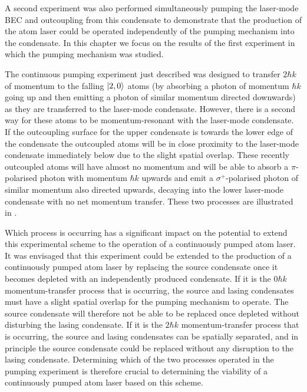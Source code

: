 A second experiment was also performed simultaneously pumping the laser-mode BEC and outcoupling from this condensate to demonstrate that the production of the atom laser could be operated independently of the pumping mechanism into the condensate.  In this chapter we focus on the results of the first experiment in which the pumping mechanism was studied.

\parasep

The continuous pumping experiment just described was designed to transfer $2 \hbar k$ of momentum to the falling ${\left|2, 0\right>}$ atoms (by absorbing a photon of momentum $\hbar k$ going up and then emitting a photon of similar momentum directed downwards) as they are transferred to the laser-mode condensate.  However, there is a second way for these atoms to be momentum-resonant with the laser-mode condensate.  If the outcoupling surface for the upper condensate is towards the lower edge of the condensate the outcoupled atoms will be in close proximity to the laser-mode condensate immediately below due to the slight spatial overlap.  These recently outcoupled atoms will have almost no momentum and will be able to absorb a $\pi$-polarised photon with momentum $\hbar k$ upwards and emit a $\sigma^+$-polarised photon of similar momentum also directed upwards, decaying into the lower laser-mode condensate with no net momentum transfer.  These two processes are illustrated in .

Which process is occurring has a significant impact on the potential to extend this experimental scheme to the operation of a continuously pumped atom laser.  It was envisaged that this experiment could be extended to the production of a continuously pumped atom laser by replacing the source condensate once it becomes depleted with an independently produced condensate.  If it is the $0 \hbar k$ momentum-transfer process that is occurring, the source and lasing condensates must have a slight spatial overlap for the pumping mechanism to operate.  The source condensate will therefore not be able to be replaced once depleted without disturbing the lasing condensate.  If it is the $2 \hbar k$ momentum-transfer process that is occurring, the source and lasing condensates can be spatially separated, and in principle the source condensate could be replaced without any disruption to the lasing condensate.  Determining which of the two processes operated in the pumping experiment is therefore crucial to determining the viability of a continuously pumped atom laser based on this scheme.

